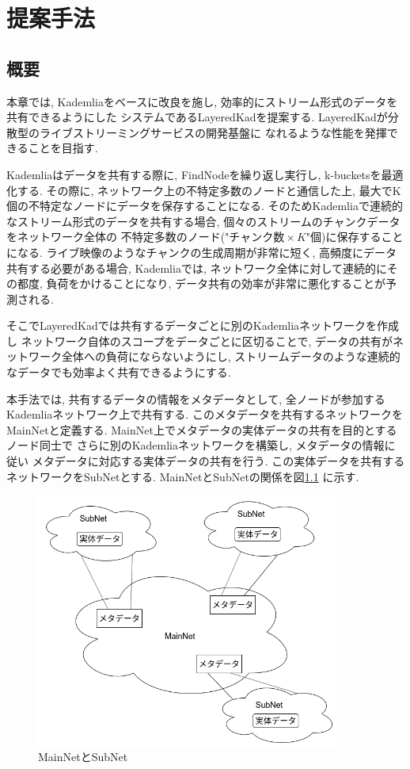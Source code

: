 \documentclass[sotsuron]{jcsie}
\begin{document}

\chapter{提案手法}
\section{概要}
本章では, Kademliaをベースに改良を施し, 
効率的にストリーム形式のデータを共有できるようにした
システムであるLayeredKadを提案する.
LayeredKadが分散型のライブストリーミングサービスの開発基盤に
なれるような性能を発揮できることを目指す.

Kademliaはデータを共有する際に, 
FindNodeを繰り返し実行し, k-bucketsを最適化する.
その際に, ネットワーク上の不特定多数のノードと通信した上, 
最大でK個の不特定なノードにデータを保存することになる.
そのためKademliaで連続的なストリーム形式のデータを共有する場合, 
個々のストリームのチャンクデータをネットワーク全体の
不特定多数のノード("$ チャンク数 \times K $"個)に保存することになる.
ライブ映像のようなチャンクの生成周期が非常に短く, 
高頻度にデータ共有する必要がある場合, Kademliaでは, 
ネットワーク全体に対して連続的にその都度, 負荷をかけることになり, 
データ共有の効率が非常に悪化することが予測される.

そこでLayeredKadでは共有するデータごとに別のKademliaネットワークを作成し
ネットワーク自体のスコープをデータごとに区切ることで, 
データの共有がネットワーク全体への負荷にならないようにし, 
ストリームデータのような連続的なデータでも効率よく共有できるようにする.

本手法では, 共有するデータの情報をメタデータとして, 
全ノードが参加するKademliaネットワーク上で共有する.
このメタデータを共有するネットワークをMainNetと定義する.
MainNet上でメタデータの実体データの共有を目的とするノード同士で
さらに別のKademliaネットワークを構築し, メタデータの情報に従い
メタデータに対応する実体データの共有を行う.
この実体データを共有するネットワークをSubNetとする.
MainNetとSubNetの関係を図\ref{fig:image}
に示す.

\begin{figure}[H]
	\centering
	\includegraphics[width=10cm]{./assets/image/image.png}
	\caption{MainNetとSubNet}
	\label{fig:image}
\end{figure}
\end{document}
